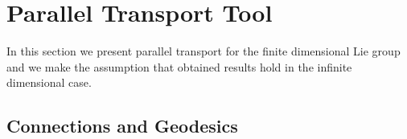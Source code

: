 
\chapter{Parallel Transport Tool}\label{ch:parallel_transport}

In this section we present parallel transport for the finite dimensional Lie group and we make the assumption that obtained results hold in the infinite dimensional case.




\section{Connections and Geodesics}

